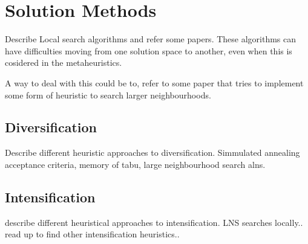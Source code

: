 \documentclass[../main.tex]{subfiles}
\begin{document}
                                                
\chapter{Solution Methods}
\label{ch:methods}

Describe Local search algorithms and refer some papers. 
These algorithms can have difficulties moving from one solution space to another, even when this is cosidered in the metaheuristics. \par
A way to deal with this could be to, refer to some paper that tries to implement some form of heuristic to search larger neighbourhoods.


\section{Diversification}
\label{sec:divers}
Describe different heuristic approaches to diversification. Simmulated annealing acceptance criteria, memory of tabu, large neighbourhood search alns.

\section{Intensification}
\label{sec:intens}
describe different heuristical approaches to intensification. LNS searches locally.. read up to find other intensification heuristics..

\biblio
\end{document}
